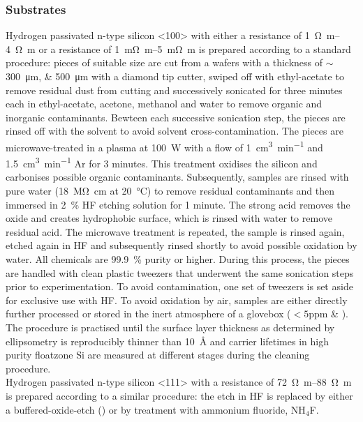 \subsubsection{\sih{} Substrates}
Hydrogen passivated n-type silicon <100> with either a resistance of \SIrange{1}{4}{\ohm\metre} or a resistance of \SIrange{1}{5}{\milli\ohm\metre} is prepared according to a standard procedure: pieces of suitable size are cut from a wafers with a thickness of $\sim$\SIlist{300;500}{\micro\metre} with a diamond tip cutter, swiped off with ethyl-acetate to remove residual dust from cutting and successively sonicated for three minutes each in ethyl-acetate, acetone, methanol and water to remove organic and inorganic contaminants. Bewteen each successive sonication step, the pieces are rinsed off with the  solvent to avoid solvent cross-contamination. The pieces are microwave-treated in a plasma at \SI{100}{\watt} with a flow of \SI{1}{\cubic\centi\metre\per\minute} \oxy{} and \SI{1.5}{\cubic\centi\metre\per\minute} Ar for 3 minutes. This treatment oxidises the silicon and carbonises possible organic contaminants. Subsequently, samples are rinsed with pure water (\SI{18}{\mega\ohm\centi\metre} at \SI{20}{\degreeCelsius}) to remove residual contaminants and then immersed in \SI{2}{\percent} HF etching solution for 1 minute. The strong acid removes the oxide and creates hydrophobic \sih{} surface, which is rinsed with water to remove residual acid. The microwave treatment is repeated, the sample is rinsed again, etched again in HF and subsequently rinsed shortly to avoid possible oxidation by water. All chemicals are \SI{99.9}{\percent} purity or higher. During this process, the pieces are handled with clean plastic tweezers that underwent the same sonication steps prior to experimentation. To avoid contamination, one set of tweezers is set aside for exclusive use with HF. To avoid oxidation by air, samples are either directly further processed or stored in the inert atmosphere of a glovebox ($<\num{5}$ppm \oxy{} \& \water{}).\\
The procedure is practised until the surface layer thickness as determined by ellipsometry is reproducibly thinner than \SI{10}{\angstrom} and carrier lifetimes in high purity floatzone Si are measured at different stages during the cleaning procedure.\\
Hydrogen passivated n-type silicon <111> with a resistance of \SIrange{72}{88}{\ohm\metre} is prepared according to a similar procedure: the etch in HF is replaced by either a buffered-oxide-etch (\boe{}) or by treatment with ammonium fluoride, NH$_4$F.
